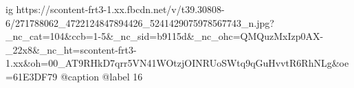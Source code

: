  
 
 
 
 

\ifcmt
  ig https://scontent-frt3-1.xx.fbcdn.net/v/t39.30808-6/271788062_4722124847894426_5241429075978567743_n.jpg?_nc_cat=104&ccb=1-5&_nc_sid=b9115d&_nc_ohc=QMQuzMxIzp0AX-_22x8&_nc_ht=scontent-frt3-1.xx&oh=00_AT9RHkD7qrr5VN41WOtzjOINRUoSWtq9qGuHvvtR6RhNLg&oe=61E3DF79
  @caption @label 16
\fi
